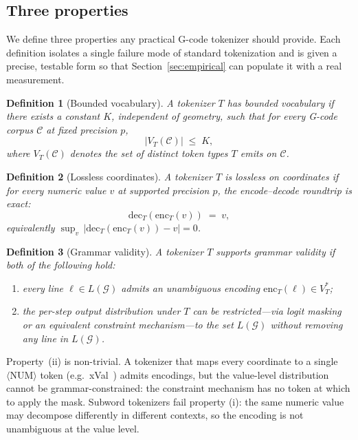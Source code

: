 \documentclass[11pt]{article}
\newtheorem{definition}{Definition}
\begin{document}
\subsection{Three properties}
\label{sec:three_properties}

We define three properties any practical G-code tokenizer should provide. Each definition isolates a single failure mode of standard tokenization and is given a precise, testable form so that Section~\ref{sec:empirical} can populate it with a real measurement.

\begin{definition}[Bounded vocabulary]
\label{def:bounded}
A tokenizer $T$ has \emph{bounded vocabulary} if there exists a constant $K$, independent of geometry, such that for every G-code corpus $\mathcal{C}$ at fixed precision $p$,
\[
    |V_T(\mathcal{C})| \;\le\; K,
\]
where $V_T(\mathcal{C})$ denotes the set of distinct token types $T$ emits on $\mathcal{C}$.
\end{definition}

\begin{definition}[Lossless coordinates]
\label{def:lossless}
A tokenizer $T$ is \emph{lossless on coordinates} if for every numeric value $v$ at supported precision $p$, the encode--decode roundtrip is exact:
\[
    \mathrm{dec}_T(\mathrm{enc}_T(v)) \;=\; v,
\]
equivalently $\sup_{v}\, |\mathrm{dec}_T(\mathrm{enc}_T(v)) - v| = 0$.
\end{definition}

\begin{definition}[Grammar validity]
\label{def:grammar_valid}
A tokenizer $T$ \emph{supports grammar validity} if both of the following hold:
\begin{enumerate}[leftmargin=*, label=(\roman*)]
    \item every line $\ell \in L(\mathcal{G})$ admits an unambiguous encoding $\mathrm{enc}_T(\ell) \in V_T^{\ast}$;
    \item the per-step output distribution under $T$ can be restricted---via logit masking or an equivalent constraint mechanism---to the set $L(\mathcal{G})$ without removing any line in $L(\mathcal{G})$.
\end{enumerate}
\end{definition}

Property~(ii) is non-trivial. A tokenizer that maps every coordinate to a single $\langle\mathrm{NUM}\rangle$ token (e.g.\ xVal~\cite{xval}) admits encodings, but the value-level distribution cannot be grammar-constrained: the constraint mechanism has no token at which to apply the mask. Subword tokenizers fail property (i): the same numeric value may decompose differently in different contexts, so the encoding is not unambiguous at the value level.
\end{document}
